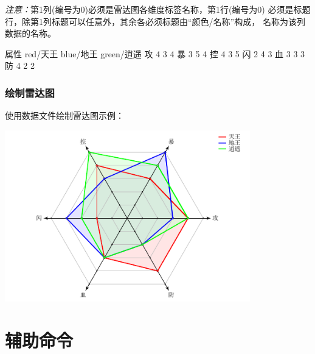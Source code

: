 \documentclass[DIV         = 12,
               fontsize    = 10,
               headinclude = false,
               index       = totoc,
               footinclude = false,
               twoside,
               headings    = small
               ]{tkz-doc}
\begin{document}
\emph{注意：}第1列(编号为0)必须是雷达图各维度标签名称，第1行(编号为0)
必须是标题行，除第1列标题可以任意外，其余各必须标题由``颜色/名称''构成，
名称为该列数据的名称。

\begin{tkzltxexample}[]
  属性 red/天王 blue/地王 green/逍遥
  攻   4        3        4
  暴   3        5        4
  控   4        3        5
  闪   2        4        3
  血   3        3        3
  防   4        2        2
\end{tkzltxexample}

\subsubsection{绘制雷达图}
使用数据文件绘制雷达图示例：

\begin{tkzexample}[latex=9cm, code only]
\end{tkzexample}

\begin{center}
 \includegraphics[width=0.8\textwidth]{radar7} 
\end{center}

\newpage
\section{辅助命令}
\end{document}
